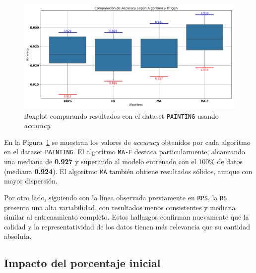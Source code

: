 \begin{figure}[htp]
    \centering
    \includegraphics[width=1\textwidth]{imagenes/evaluaciones/painting/comparacion-por-algoritmo.png}
    \caption{Boxplot comparando resultados con el dataset \texttt{PAINTING} usando \textit{accuracy}.}
    \label{fig:comparacion-por-algoritmo}
\end{figure}

En la Figura~\ref{fig:comparacion-por-algoritmo} se muestran los valores de \textit{accuracy} obtenidos por cada algoritmo en el dataset \texttt{PAINTING}.
El algoritmo \texttt{MA-F} destaca particularmente, alcanzando una mediana de \textbf{0.927} y superando al modelo entrenado con el 100\% de datos (mediana \textbf{0.924}).
El algoritmo \texttt{MA} también obtiene resultados sólidos, aunque con mayor dispersión.

Por otro lado, siguiendo con la línea observada previamente en \texttt{RPS}, la \texttt{RS} presenta una alta variabilidad,
con resultados menos consistentes y mediana similar al entrenamiento completo.
Estos hallazgos confirman nuevamente que la calidad y la representatividad de los datos tienen más relevancia que su cantidad absoluta.

\subsection{Impacto del porcentaje inicial}

